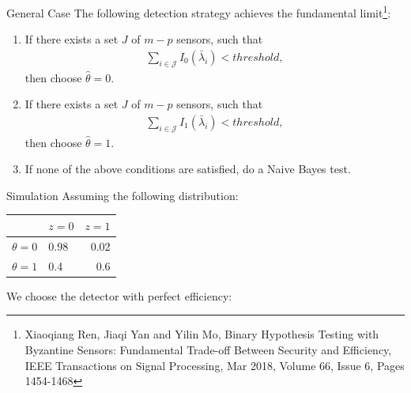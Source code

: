 \documentclass[10pt]{beamer}
\newcommand{\tikzdir}[1]{#1.tikz}
\newcommand{\inputtikz}[1]{}}
\begin{document}
\begin{frame}{General Case}
  The following detection strategy achieves the fundamental limit\footnote{Xiaoqiang Ren, Jiaqi Yan and Yilin Mo, Binary Hypothesis Testing with Byzantine Sensors: Fundamental Trade-off Between Security and Efficiency, IEEE Transactions on Signal Processing, Mar 2018, Volume 66, Issue 6, Pages 1454-1468 }:
  \begin{enumerate}
  \item If there exists a set $J$ of $m-p$ sensors, such that
    \begin{align*}
      \sum_{i\in \mathcal J}I_0(\bar \lambda_i) < threshold,
    \end{align*}
    then choose $\hat \theta = 0$. 
  \item If there exists a set $J$ of $m-p$ sensors, such that
    \begin{align*}
      \sum_{i\in \mathcal J}I_1(\bar \lambda_i) < threshold,
    \end{align*}
    then choose $\hat \theta = 1$. 
  \item If none of the above conditions are satisfied, do a Naive Bayes test.
  \end{enumerate}
\end{frame}

\begin{frame}{Simulation}
  Assuming the following distribution:
  \begin{center}
    \begin{tabular}{@{}llr@{}}
      \toprule
      & $z = 0$ & $z=1$\\
      \midrule
      $\theta=0$ &0.98&0.02\\
      $\theta=1$ &0.4&0.6\\
      \bottomrule
    \end{tabular}
  \end{center}  
  We choose the detector with perfect efficiency:
  \begin{center}
    \inputtikz{finite_time}
  \end{center}
\end{frame}
\end{document}
